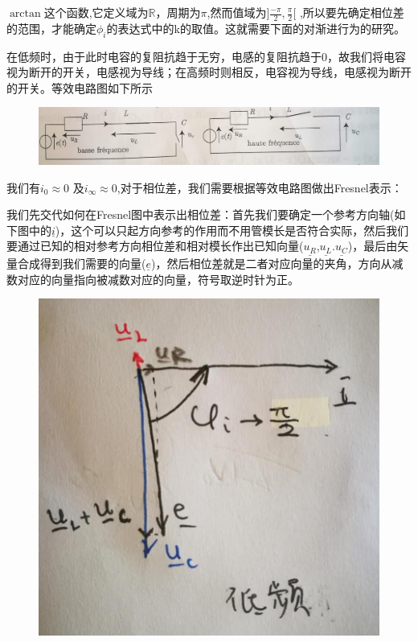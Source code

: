 \documentclass[12pt]{book}
\theoremstyle{definition}\newtheorem{dfn}{Définition}[chapter]
\theoremstyle{plain}\newtheorem{thm}{Théorème}[chapter]
\theoremstyle{plain}\newtheorem{prp}{Proposition}[chapter]
\theoremstyle{plain}\newtheorem{lem}{\bf Lemme}[chapter]
\theoremstyle{plain}\newtheorem{axm}{\bf Axiome}[chapter]
\theoremstyle{plain}\newtheorem{lmm}{\bf Lemme}[chapter]
\theoremstyle{plain}\newtheorem{cor}{\bf Corollaire}[chapter]
\theoremstyle{remark}\newtheorem{rem}{Remarque}[chapter]
\begin{document}
$\arctan$这个函数,它定义域为$\mathbb{R}$，周期为$\pi$,然而值域为$]\frac{-\pi}{2},\frac{\pi}{2}[ $
,所以要先确定相位差的范围，才能确定$\phi_{i}$的表达式中的k的取值。这就需要下面的对渐进行为的研究。


在低频时，由于此时电容的复阻抗趋于无穷，电感的复阻抗趋于0，故我们将电容视为断开的开关，电感视为导线；在高频时则相反，电容视为导线，电感视为断开的开关。等效电路图如下所示
\begin{figure}[H]
	\centering
	\includegraphics[scale=0.15]{image//Etude du circuit RLC serie-Resonances//3}
\end{figure}
我们有$i_0\approx 0$ 及$i_{\infty}\approx0$,对于相位差，我们需要根据等效电路图做出Fresnel表示：

我们先交代如何在Fresnel图中表示出相位差：首先我们要确定一个参考方向轴(如下图中的$\underline{i}$)，这个可以只起方向参考的作用而不用管模长是否符合实际，然后我们要通过已知的相对参考方向相位差和相对模长作出已知向量($\underline{u_R}$,$\underline{u_L}$.$\underline{u_C}$)，最后由矢量合成得到我们需要的向量($\underline{e}$)，然后相位差就是二者对应向量的夹角，方向从减数对应的向量指向被减数对应的向量，符号取逆时针为正。
\begin{figure}[H]
	\centering
	\includegraphics[scale=0.2]{image//Etude du circuit RLC serie-Resonances//4}
\end{figure}
\end{document}
